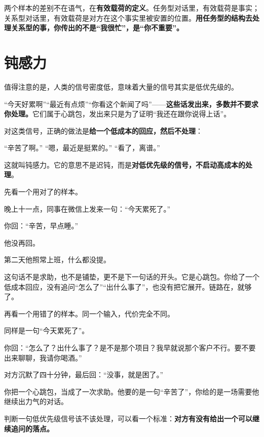两个样本的差别不在语气，在\textbf{有效载荷的定义}。任务型对话里，有效载荷是事实；关系型对话里，有效载荷是对方在这个事实里被安置的位置。\textbf{用任务型的结构去处理关系型的事，你传出的不是“我很忙”，是“你不重要”。}

\section{钝感力}

值得注意的是，人类的信号密度低，意味着大量的信号其实是低优先级的。

“今天好累啊”“最近有点烦”“你看这个新闻了吗”——\textbf{这些话发出来，多数并不要求你处理。}它们属于心跳包，发出来只是为了证明“我还在跟你说得上话”。

对这类信号，正确的做法是\textbf{给一个低成本的回应，然后不处理}：

\begin{mdquote}
“辛苦了啊。” “嗯，最近是挺累的。” “看了，离谱。”
\end{mdquote}

这就叫钝感力。它的意思不是迟钝，而是\textbf{对低优先级的信号，不启动高成本的处理}。

先看一个用对了的样本。

\par
\begin{mdquote}
晚上十一点，同事在微信上发来一句：“今天累死了。”\par
你回：“辛苦，早点睡。”\par
他没再回。\par
第二天他照常上班，什么都没提。\par
这句话不是求助，也不是铺垫，更不是下一句话的开头。它是心跳包。你给了一个低成本回应，没有追问“怎么了”“出什么事了”，也没有把它展开。链路在，就够了。
\end{mdquote}

再看一个用错了的样本。同一个输入，代价完全不同。

\par
\begin{mdquote}
同样是一句“今天累死了”。\par
你回：“怎么了？出什么事了？是不是那个项目？我早就说那个客户不行。要不要出来聊聊，我请你喝酒。”\par
对方沉默了四十分钟，最后回：“没事，就是困了。”\par
你把一个心跳包，当成了一次求助。他要的是一句“辛苦了”，你给的是一场需要他继续出力气的对话。
\end{mdquote}

判断一句低优先级信号该不该处理，可以看一个标准：\textbf{对方有没有给出一个可以继续追问的落点。}

